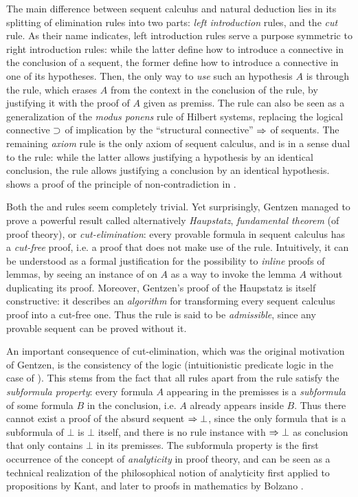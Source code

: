 The main difference between sequent calculus and natural deduction lies in its
splitting of elimination rules into two parts: \emph{left introduction} rules,
and the \emph{cut} rule. As their name indicates, left introduction rules serve
a purpose symmetric to right introduction rules: while the latter define how to
introduce a connective in the conclusion of a sequent, the former define how to
introduce a connective in one of its hypotheses. Then, the only way to
\emph{use} such an hypothesis $A$ is through the  rule, which erases
$A$ from the context in the conclusion of the rule, by justifying it with the
proof of $A$ given as premiss. The  rule can also be seen as a
generalization of the \textit{modus ponens} rule of Hilbert systems, replacing
the logical connective $\supset$ of implication by the ``structural connective''
$\Rightarrow$ of sequents. The remaining \emph{axiom} rule  is the only axiom
of sequent calculus, and is in a sense dual to the  rule: while the
latter allows justifying a hypothesis by an identical conclusion, the 
rule allows justifying a conclusion by an identical hypothesis. 
shows a proof of the principle of non-contradiction in .

Both the  and  rules seem completely trivial. Yet surprisingly,
Gentzen managed to prove a powerful result called alternatively
\textit{Haupstatz}, \emph{fundamental theorem} (of proof theory), or
\emph{cut-elimination}: every provable formula in sequent calculus has a
\emph{cut-free} proof, i.e. a proof that does not make use of the 
rule. Intuitively, it can be understood as a formal justification for the
possibility to \emph{inline} proofs of lemmas, by seeing an instance of
 on $A$ as a way to invoke the lemma $A$ without duplicating its proof.
Moreover, Gentzen's proof of the Haupstatz is itself constructive: it describes
an \emph{algorithm} for transforming every sequent calculus proof into a
cut-free one. Thus the  rule is said to be \emph{admissible}, since any
provable sequent can be proved without it.

An important consequence of cut-elimination, which was the original motivation
of Gentzen, is the consistency of the logic (intuitionistic predicate logic in
the case of ). This stems from the fact that all rules apart from the
 rule satisfy the \emph{subformula property}: every formula $A$
appearing in the premisses is a \emph{subformula} of some formula $B$ in the
conclusion, i.e. $A$ already appears inside $B$. Thus there cannot exist a proof
of the absurd sequent $\Rightarrow \bot$, since the only formula that is a subformula
of $\bot$ is $\bot$ itself, and there is no rule instance with $\Rightarrow \bot$ as
conclusion that only contains $\bot$ in its premisses. The subformula property
is the first occurrence of the concept of \emph{analyticity} in proof theory,
and can be seen as a technical realization of the philosophical notion of
analyticity first applied to propositions by Kant, and later to proofs in
mathematics by Bolzano .

